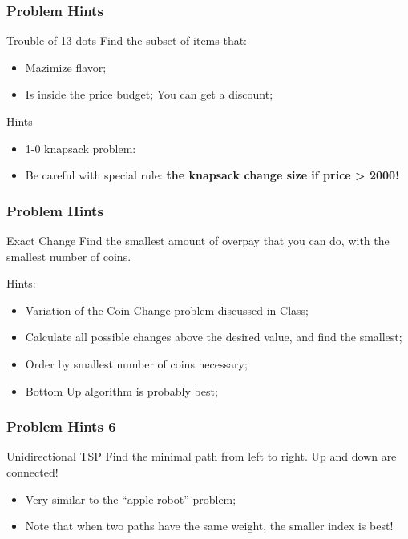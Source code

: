 \begin{frame}
  \frametitle{Problem Hints}
  \begin{block}{Trouble of 13 dots}
    Find the subset of items that:
    \begin{itemize}
    \item Mazimize flavor;
    \item Is inside the price budget; You can get a discount;
    \end{itemize}
  \end{block}

  \bigskip

  Hints
  \begin{itemize}
  \item 1-0 knapsack problem:
  \item Be careful with special rule: {\bf the knapsack change size if price > 2000!}
  \end{itemize}
\end{frame}

\begin{frame}
  \frametitle{Problem Hints}
  \begin{block}{Exact Change}
    Find the smallest amount of overpay that you can do, with the
    smallest number of coins.
  \end{block}

  \bigskip
  Hints:
  \begin{itemize}
  \item Variation of the Coin Change problem discussed in Class;
  \item Calculate all possible changes above the desired value, and find the smallest;
  \item Order by smallest number of coins necessary;
  \item Bottom Up algorithm is probably best;
  \end{itemize}
\end{frame}

\begin{frame}
  \frametitle{Problem Hints 6}
  \begin{block}{Unidirectional TSP}
    Find the minimal path from left to right. Up and down are connected!
  \end{block}

  \bigskip

  \begin{itemize}
  \item Very similar to the ``apple robot'' problem;
  \item Note that when two paths have the same weight, the smaller index is best!
  \end{itemize}
\end{frame}

